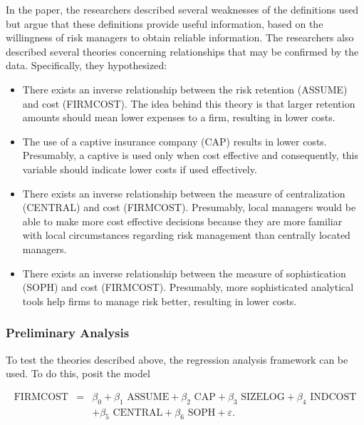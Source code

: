 In the paper, the researchers described several weaknesses of the
definitions used but argue that these definitions provide useful
information, based on the willingness of risk managers to obtain
reliable information. The researchers also described several
theories concerning relationships that may be confirmed by the data.
Specifically, they hypothesized:
\begin{itemize}

\item There exists an inverse relationship between the risk
retention (ASSUME) and cost (FIRMCOST). The idea behind this theory
is that larger retention amounts should mean lower expenses to a
firm, resulting in lower costs.

\item  The use of a captive insurance company (CAP) results in lower costs.
Presumably, a captive is used only when cost effective and
consequently, this variable should indicate lower costs if used
effectively.

\item  There exists an inverse relationship between the measure of
centralization (CENTRAL) and cost (FIRMCOST). Presumably, local
managers would be able to make more cost effective decisions because
they are more familiar with local circumstances regarding risk
management than centrally located managers.

\item  There exists an inverse relationship between the measure of
sophistication (SOPH) and cost (FIRMCOST). Presumably, more
sophisticated analytical tools help firms to manage risk better,
resulting in lower costs.
\end{itemize}

\subsubsection*{Preliminary Analysis}

To test the theories described above, the regression analysis framework can
be used. To do this, posit the model

\begin{center}
\begin{eqnarray*}
\text{FIRMCOST} &=&\beta_0 +\beta_1 \text{ ASSUME}+\beta _{2}\text{ CAP}%
+\beta _{3}\text{ SIZELOG}+\beta_4\text{ INDCOST} \\
&&+\beta_5\text{ CENTRAL}+\beta_6\text{ SOPH}+ \varepsilon.
\end{eqnarray*}
\end{center}

